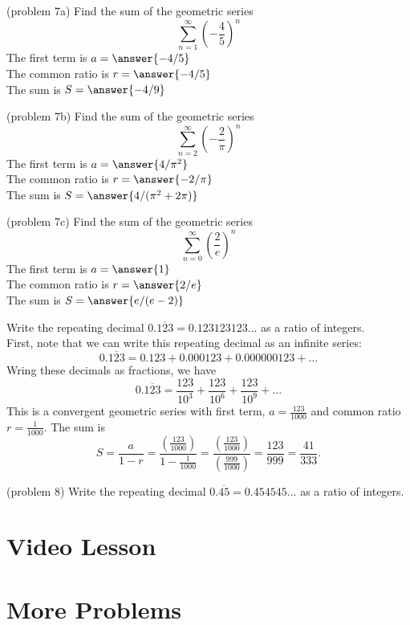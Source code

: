\documentclass{ximera}
\begin{document}
\begin{problem}(problem 7a)
Find the sum of the geometric series 
\[
\sum_{n=1}^\infty \left(-\frac45\right)^n
\]
The first term is $a = \answer{-4/5}$\\
The common ratio is $r = \answer{-4/5}$\\
The sum is $S= \answer{-4/9}$

\end{problem}


\begin{problem}(problem 7b)
Find the sum of the geometric series 
\[
\sum_{n=2}^\infty \left(-\frac{2}{\pi}\right)^n
\]
The first term is $a = \answer{4/\pi^2}$\\
The common ratio is $r = \answer{-2/\pi}$\\
The sum is $S= \answer{4/(\pi^2 + 2\pi)}$

\end{problem}

\begin{problem}(problem 7c)
Find the sum of the geometric series 
\[
\sum_{n=0}^\infty \left(\frac{2}{e}\right)^n
\]
The first term is $a = \answer{1}$\\
The common ratio is $r = \answer{2/e}$\\
The sum is $S= \answer{e/(e-2)}$

\end{problem}

\begin{example}[example 8]
Write the repeating decimal $0.\overline{123} = 0.123123123...$ as a ratio of integers.\\
First, note that we can write this repeating decimal as an infinite series:
\[
0.\overline{123} = 0.123 + 0.000123 + 0.000000123 + \dots
\]
Wring these decimals as fractions, we have
\[
0.\overline{123} =\frac{123}{10^3} + \frac{123}{10^6}+\frac{123}{10^9} + \dots
\]
This is a convergent geometric series with first term, $a = \frac{123}{1000}$ and common ratio $r = \frac{1}{1000}$.
The sum is 
\[
S = \frac{a}{1-r} = \frac{\left(\frac{123}{1000}\right)}{1-\frac{1}{1000}} = \frac{\left(\frac{123}{1000}\right)}{\left(\frac{999}{1000}\right)}
= \frac{123}{999} = \frac{41}{333}.
\]

\end{example}

\begin{problem}(problem 8)
Write the repeating decimal $0.\overline{45} = 0.454545...$ as a ratio of integers.\\
\begin{multipleChoice}
\end{multipleChoice}
\end{problem}
\section{Video Lesson}


\begin{center}
\begin{foldable}
\end{foldable}
\end{center}


\section{More Problems}
\end{document}
